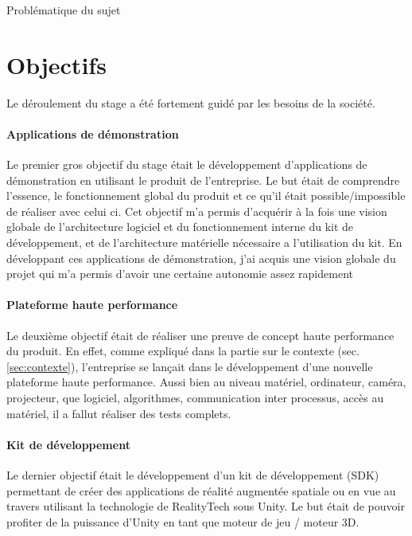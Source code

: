 \begin{center}
Problématique du sujet
\end{center}


\section{Objectifs}
Le déroulement du stage a été fortement guidé par les besoins de la société.

\paragraph{Applications de démonstration} Le premier gros objectif du stage était le développement d'applications de démonstration en utilisant le produit de l'entreprise. Le but était de comprendre l'essence, le fonctionnement global du produit et ce qu'il était possible/impossible de réaliser avec celui ci. Cet objectif m'a permis d'acquérir à la fois une vision globale de l'architecture logiciel et du fonctionnement interne du kit de développement, et de l'architecture matérielle nécessaire a l'utilisation du kit. En développant ces applications de démonstration, j'ai acquis une vision globale du projet qui m'a permis d'avoir une certaine autonomie assez rapidement

\paragraph{Plateforme haute performance} Le deuxième objectif était de réaliser une preuve de concept haute performance du produit. En effet, comme expliqué dans la partie sur le contexte (sec. \ref{sec:contexte}), l'entreprise se lançait dans le développement d'une nouvelle plateforme haute performance. Aussi bien au niveau matériel, ordinateur, caméra, projecteur, que logiciel, algorithmes, communication inter processus, accès au matériel, il a fallut réaliser des tests complets.

\paragraph{Kit de développement} Le dernier objectif était le développement d'un kit de développement (SDK) permettant de créer des applications de réalité augmentée spatiale ou en vue au travers utilisant la technologie de RealityTech sous Unity. Le but était de pouvoir profiter de la puissance d'Unity en tant que moteur de jeu / moteur 3D. %
